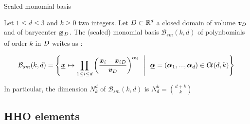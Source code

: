 \documentclass[fleqn]{article}
\begin{document}
        \begin{defbox}{Scaled monomial basis}

          Let $1 \leq d \leq 3$ and $k \geq 0$ two integers. Let $D \subset \mathbb{R}^d$ a closed domain of volume $\bm{v}_{D}$ and of barycenter $\tensori{x} \subscript{\Domain}$. The (scaled) monomial basis $\mathcal{B}_{sm}(k, d)$ of polynbomials of order $k$ in $D$ writes as :

          \begin{equation}
            \mathcal{B}_{sm}(k, d) =
            \Bigg\{
              \tensori{x} \mapsto
              \prod_{1 \leq i \leq d}
              {\left(
                \frac{\tensoro{x}\subscript{i} - \tensoro{x}\subscript{i} \subscript{\Domain}}{\tensoro{v}_{\Domain}}
              \right)}^{\tensoro{\alpha}\subscript{i}}
              \ \ \Bigg\vert \ \ 
              \tensori{\alpha} = (\tensoro{\alpha}\subscript{1}, ..., \tensoro{\alpha}\subscript{d}) \in \captize{\alpha}(d,k)
            \Bigg\}
          \end{equation}

          In particular, the dimension $N_k^d$ of $\mathcal{B}_{sm}(k, d)$ is $N_d^k = \binom{d+k}{k}$

        \end{defbox}

    \subsection{HHO elements}

        

    

  
  


  
\end{document}
